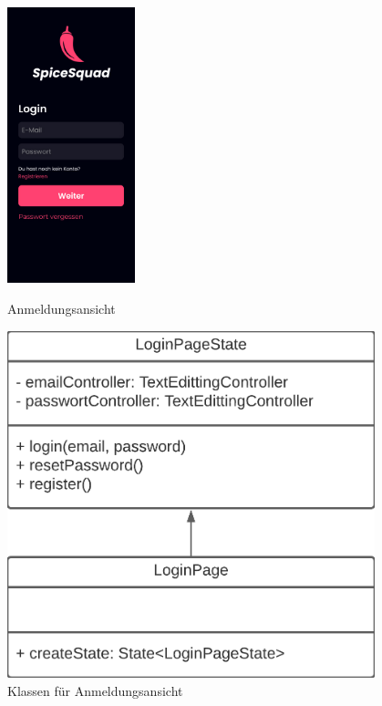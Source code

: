 \documentclass[parskip=full]{scrartcl}
\begin{document}
    \begin{figure}[htp]
        \begin{minipage}
            [t]{0.49\textwidth}
            \centering
            \includegraphics[height=80mm]{images/Presentation-layer/LoginView.jpg}
            \caption{Anmeldungsansicht}
        \end{minipage}
        \begin{minipage}
            [t]{0.49\textwidth}
            \centering
            \includegraphics[width=0.95\textwidth]{images/Presentation-layer/LoginViewClass.png}
            \caption{Klassen für Anmeldungsansicht}
        \end{minipage}
    \end{figure}    
        
\end{document}
